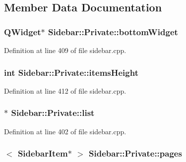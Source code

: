 \subsection{Member Data Documentation}
\hypertarget{classSidebar_1_1Private_a4ba08960dff0b43cb43421a2ad171163}{
\subsubsection[{bottom\+Widget}]{\setlength{\rightskip}{0pt plus 5cm}Q\+Widget$\ast$ Sidebar\+::\+Private\+::bottom\+Widget}}\label{classSidebar_1_1Private_a4ba08960dff0b43cb43421a2ad171163}


Definition at line 409 of file sidebar.\+cpp.

\hypertarget{classSidebar_1_1Private_a467a6317bcfa987166b354f2145e1dbb}{
\subsubsection[{items\+Height}]{\setlength{\rightskip}{0pt plus 5cm}int Sidebar\+::\+Private\+::items\+Height}}\label{classSidebar_1_1Private_a467a6317bcfa987166b354f2145e1dbb}


Definition at line 412 of file sidebar.\+cpp.

\hypertarget{classSidebar_1_1Private_a0b3cabc80bb0d0d9259723cbe786908e}{
\subsubsection[{list}]{$\ast$ Sidebar\+::\+Private\+::list}}\label{classSidebar_1_1Private_a0b3cabc80bb0d0d9259723cbe786908e}


Definition at line 402 of file sidebar.\+cpp.

\hypertarget{classSidebar_1_1Private_a4433064c6850086bce54e0ce62dc8885}{
\subsubsection[{pages}]{$<$ {\bf Sidebar\+Item}$\ast$ $>$ Sidebar\+::\+Private\+::pages}}\label{classSidebar_1_1Private_a4433064c6850086bce54e0ce62dc8885}


